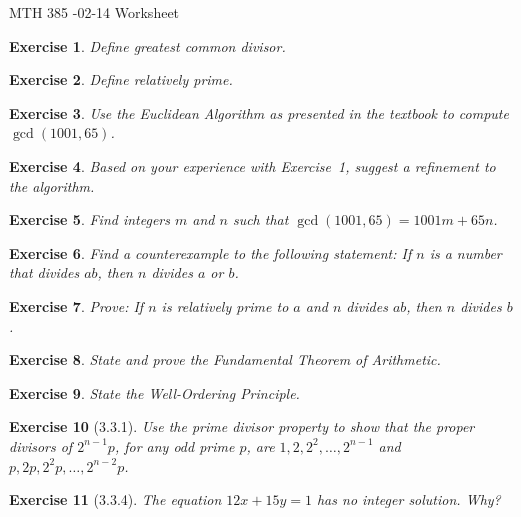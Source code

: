 \documentclass[12pt]{article}
\theoremstyle{plain}
\newtheorem{ex}{Exercise}
\begin{document}
MTH 385 -02-14 Worksheet

\begin{ex}
  Define \emph{greatest common divisor}.
\end{ex}

\begin{ex}
  Define \emph{relatively prime}.
\end{ex}

\begin{ex}
  Use the Euclidean Algorithm \emph{as presented in the textbook} to compute $\gcd(1001,65)$.
\end{ex}

\begin{ex}
  Based on your experience with Exercise~1, suggest a refinement to the algorithm.
\end{ex}

\begin{ex}
  Find integers $m$ and $n$ such that $\gcd(1001,65)=1001m+65n$.
\end{ex}

\begin{ex}
  Find a counterexample to the following statement: If $n$ is a number that divides $ab$, then $n$ divides $a$ or $b$.
\end{ex}

\begin{ex}
  Prove:  If $n$ is relatively prime to $a$ and $n$ divides $ab$, then $n$ divides $b$.
\end{ex}

\begin{ex}
  State and prove the \emph{Fundamental Theorem of Arithmetic}.
\end{ex}

\begin{ex}
  State the \emph{Well-Ordering Principle}.
\end{ex}

\begin{ex} [3.3.1]
  Use the prime divisor property to show that the proper divisors of $2^{n-1}p$, for any odd prime $p$, are $1,2,2^2,\ldots,2^{n-1}$ and $p,2p,2^2p,\ldots,2^{n-2}p$.
\end{ex}

\begin{ex} [3.3.4]
  The equation $12x+15y=1$ has no integer solution. Why?
\end{ex}
\end{document}
